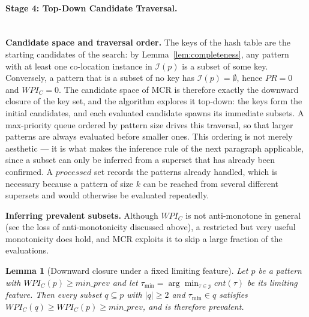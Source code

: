 \documentclass[12pt, letterpaper]{template}
\newtheorem{lemma}{Lemma}
\theoremstyle{definition}
\begin{document}
\paragraph{Stage 4: Top-Down Candidate Traversal.}
\label{subsec:mcr_traversal}
\leavevmode\\[0.5em]
\noindent\textbf{Candidate space and traversal order.}
The keys of the hash table are the starting candidates of the search: by
Lemma~\ref{lem:completeness}, any pattern with at
least one co-location instance in $\mathcal{I}(p)$ is a subset of some key.
Conversely, a pattern that is a subset of no key has
$\mathcal{I}(p) = \emptyset$, hence $PR = 0$ and $WPI_C = 0$. The candidate
space of MCR is therefore exactly the downward closure of the key set, and
the algorithm explores it top-down: the keys form the initial candidates,
and each evaluated candidate spawns its immediate subsets. A max-priority
queue ordered by pattern size drives this traversal, so that larger
patterns are always evaluated before smaller ones. This ordering is not
merely aesthetic --- it is what makes the inference rule of the next
paragraph applicable, since a subset can only be inferred from a superset
that has already been confirmed. A $processed$ set records the patterns
already handled, which is necessary because a pattern of size $k$ can be
reached from several different supersets and would otherwise be evaluated
repeatedly.

\noindent\textbf{Inferring prevalent subsets.}
Although $WPI_C$ is not anti-monotone in general (see the loss of
anti-monotonicity discussed above), a restricted but very useful
monotonicity does hold, and MCR exploits it to skip a large fraction of the
evaluations.

\begin{lemma}[Downward closure under a fixed limiting feature]
\label{lem:inference}
Let $p$ be a pattern with $WPI_C(p) \ge min\_prev$ and let
$\tau_{\min} = \arg\min_{\tau \in p} cnt(\tau)$ be its limiting feature.
Then every subset $q \subseteq p$ with $|q| \ge 2$ and $\tau_{\min} \in q$
satisfies $WPI_C(q) \ge WPI_C(p) \ge min\_prev$, and is therefore prevalent.
\end{lemma}
\end{document}
